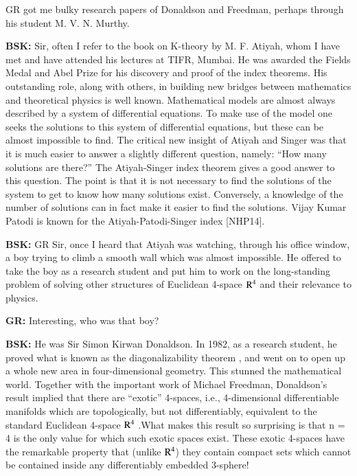 GR got me bulky research papers of Donaldson and Freedman, perhaps through his student M. V. N. Murthy.
  
\textbf{BSK:} Sir, often I refer to the book on K-theory by M. F. Atiyah, whom I have met  and have attended his lectures at TIFR, Mumbai. He was awarded the Fields Medal and Abel Prize for his discovery and proof of the index theorems. His outstanding role, along with others, in building new bridges between mathematics and theoretical physics is well known. Mathematical models are almost always described by a system of differential equations. To make use of the model one seeks the solutions to this system of differential equations, but these can be almost impossible to find. The critical new insight of Atiyah and Singer was that it is much easier to answer a slightly different question, namely: “How many solutions are there?” The Atiyah-Singer index theorem gives a good answer to this question. The point is that it is not necessary to find the solutions of the system to get to know how many solutions exist. Conversely, a knowledge of the number of solutions can in fact make it easier to find the solutions. Vijay Kumar Patodi is known for the Atiyah-Patodi-Singer index [NHP14].

\textbf{BSK:} GR Sir, once I heard that Atiyah was watching, through his office window, a boy trying to climb a smooth wall which was almost impossible. He offered to take the boy as a research student and put him to work on the long-standing problem of solving other structures of Euclidean 4-space ${\rm R}^{4}$ and their relevance to physics.

\textbf{GR:} Interesting, who was that boy?

\textbf{BSK:} He was Sir Simon Kirwan Donaldson. In 1982, as a research student, he proved what is known as the diagonalizability theorem \cite{chap17-key08SD}, and went on to open up a whole new area in four-dimensional geometry. This stunned the mathematical world. Together with the important work of Michael Freedman, Donaldson's result implied that there are “exotic” 4-spaces, i.e., 4-dimensional differentiable manifolds which are topologically, but not differentiably, equivalent to the standard Euclidean 4-space  ${\rm R}^{4}$ .What makes this result so surprising is that n = 4 is the only value for which such exotic spaces exist. These exotic 4-spaces have the remarkable property that (unlike ${\rm R}^{4}$) they contain compact sets which cannot be contained inside any differentiably embedded 3-sphere!
\vskip 1pt

